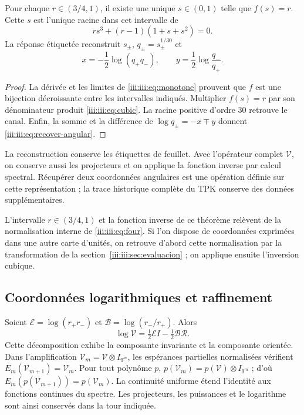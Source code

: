 \begin{theorem}
Pour chaque $r\in(3/4,1)$, il existe une unique $s\in(0,1)$ telle que $f(s)=r$.
Cette $s$ est l’unique racine dans cet intervalle de
\begin{equation}
 r s^3+(r-1)(1+s+s^2)=0.
 \label{iii:iii:eq:cubic}
\end{equation}
La réponse étiquetée reconstruit $s_\pm$, $q_\pm=s_\pm^{1/30}$ et
\begin{equation}
 x=-\frac12\log(q_+q_-),\qquad
 y=\frac12\log\frac{q_-}{q_+}.
 \label{iii:iii:eq:recover-angular}
\end{equation}
\end{theorem}
\begin{proof}
La dérivée et les limites de \eqref{iii:iii:eq:monotone} prouvent que $f$ est une
bijection décroissante entre les intervalles indiqués. Multiplier $f(s)=r$
par son dénominateur produit \eqref{iii:iii:eq:cubic}. La racine positive d’ordre
$30$ retrouve le canal. Enfin, la somme et la différence de
$\log q_\pm=-x\mp y$ donnent \eqref{iii:iii:eq:recover-angular}.
\end{proof}

La reconstruction conserve les étiquettes de feuillet. Avec l’opérateur complet
$\mathcal V$, on conserve aussi les projecteurs et on applique la fonction
inverse par calcul spectral. Récupérer deux coordonnées angulaires est une
opération définie sur cette représentation ; la trace historique complète
du TPK conserve des données supplémentaires.

L’intervalle $r\in(3/4,1)$ et la fonction inverse de ce théorème relèvent
de la normalisation interne de \eqref{iii:iii:eq:four}. Si l’on dispose de
coordonnées exprimées dans une autre carte d’unités, on retrouve d’abord
cette normalisation par la transformation de la
section~\ref{iii:iii:sec:evaluacion} ; on applique ensuite l’inversion cubique.

\subsection{Coordonnées logarithmiques et raffinement}

Soient $\mathcal E=\log(r_+r_-)$ et $\mathcal B=\log(r_-/r_+)$. Alors
\begin{equation}
 \log\mathcal V=\tfrac12\mathcal E I-\tfrac12\mathcal B\mathcal R.
 \label{iii:iii:eq:logvac}
\end{equation}
Cette décomposition exhibe la composante invariante et la composante orientée.
Dans l’amplification $\mathcal V_m=\mathcal V\otimes I_{9^m}$, les
espérances partielles normalisées vérifient
$E_m(\mathcal V_{m+1})=\mathcal V_m$. Pour tout polynôme $p$,
$p(\mathcal V_m)=p(\mathcal V)\otimes I_{9^m}$ ; d’où
$E_m(p(\mathcal V_{m+1}))=p(\mathcal V_m)$. La continuité uniforme
étend l’identité aux fonctions continues du spectre. Les projecteurs,
les puissances et le logarithme sont ainsi conservés dans la tour indiquée.

